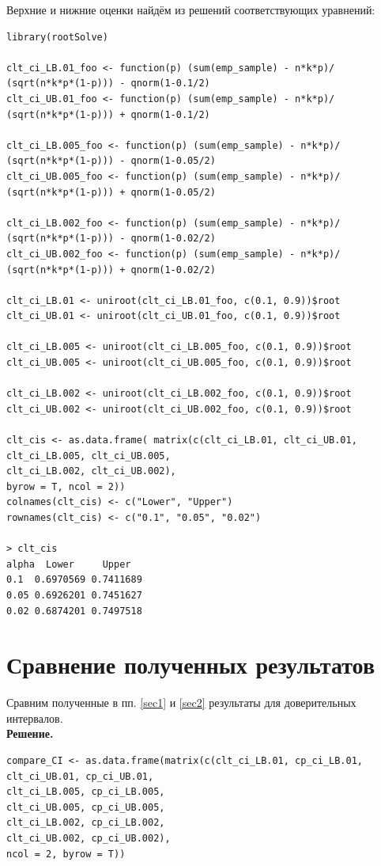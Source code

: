 \documentclass[14pt,a4paper]{scrartcl}
\begin{document}
\newpage
Верхние и нижние оценки найдём из решений соответствующих уравнений:
\begin{verbatim}
library(rootSolve)

clt_ci_LB.01_foo <- function(p) (sum(emp_sample) - n*k*p)/
(sqrt(n*k*p*(1-p))) - qnorm(1-0.1/2)
clt_ci_UB.01_foo <- function(p) (sum(emp_sample) - n*k*p)/
(sqrt(n*k*p*(1-p))) + qnorm(1-0.1/2)

clt_ci_LB.005_foo <- function(p) (sum(emp_sample) - n*k*p)/
(sqrt(n*k*p*(1-p))) - qnorm(1-0.05/2)
clt_ci_UB.005_foo <- function(p) (sum(emp_sample) - n*k*p)/
(sqrt(n*k*p*(1-p))) + qnorm(1-0.05/2)

clt_ci_LB.002_foo <- function(p) (sum(emp_sample) - n*k*p)/
(sqrt(n*k*p*(1-p))) - qnorm(1-0.02/2)
clt_ci_UB.002_foo <- function(p) (sum(emp_sample) - n*k*p)/
(sqrt(n*k*p*(1-p))) + qnorm(1-0.02/2)

clt_ci_LB.01 <- uniroot(clt_ci_LB.01_foo, c(0.1, 0.9))$root
clt_ci_UB.01 <- uniroot(clt_ci_UB.01_foo, c(0.1, 0.9))$root

clt_ci_LB.005 <- uniroot(clt_ci_LB.005_foo, c(0.1, 0.9))$root
clt_ci_UB.005 <- uniroot(clt_ci_UB.005_foo, c(0.1, 0.9))$root

clt_ci_LB.002 <- uniroot(clt_ci_LB.002_foo, c(0.1, 0.9))$root
clt_ci_UB.002 <- uniroot(clt_ci_UB.002_foo, c(0.1, 0.9))$root

clt_cis <- as.data.frame( matrix(c(clt_ci_LB.01, clt_ci_UB.01,
clt_ci_LB.005, clt_ci_UB.005,
clt_ci_LB.002, clt_ci_UB.002), 
byrow = T, ncol = 2))
colnames(clt_cis) <- c("Lower", "Upper")
rownames(clt_cis) <- c("0.1", "0.05", "0.02")

> clt_cis
alpha  Lower     Upper
0.1  0.6970569 0.7411689
0.05 0.6926201 0.7451627
0.02 0.6874201 0.7497518
\end{verbatim}

\section{Сравнение полученных результатов}
Сравним полученные в пп. \ref{sec1} и \ref{sec2} результаты для доверительных интервалов.\\
\textbf{Решение.}\\
\begin{verbatim}
compare_CI <- as.data.frame(matrix(c(clt_ci_LB.01, cp_ci_LB.01, 
clt_ci_UB.01, cp_ci_UB.01,
clt_ci_LB.005, cp_ci_LB.005,
clt_ci_UB.005, cp_ci_UB.005,
clt_ci_LB.002, cp_ci_LB.002,
clt_ci_UB.002, cp_ci_UB.002), 
ncol = 2, byrow = T))
\end{verbatim}
\end{document}
